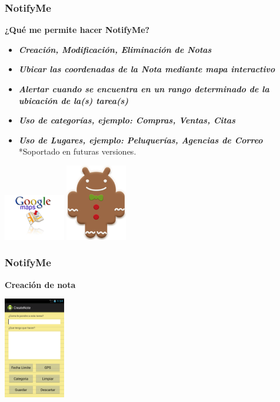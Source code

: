 \documentclass[9pt]{beamer}
\begin{document}
	\begin{frame}
		\frametitle{NotifyMe}
			\begin{block}{\textbf{¿Qué me permite hacer NotifyMe?}}
				\begin{itemize}
					\item \emph{\textbf{Creación, Modificación, Eliminación de Notas}} 
					\item \emph{\textbf{Ubicar las coordenadas de la Nota mediante mapa interactivo}}
					\item \emph{\textbf{Alertar cuando se encuentra en un rango determinado de la ubicación de la(s) tarea(s)}} 				
					\item \emph{\textbf{Uso de categorías, ejemplo: Compras, Ventas, Citas}}
					\item \emph{\textbf{Uso de Lugares, ejemplo: Peluquerías, Agencias de Correo}} *Soportado en futuras versiones.
				\end{itemize}
				\begin{center}
					\includegraphics[width=0.20\textwidth]{gmaps.png}
					\includegraphics[width=0.20\textwidth]{gingerbread.png}
				\end{center}
			\end{block}
	\end{frame}
	
	\begin{frame}
		\frametitle{NotifyMe}
			\begin{block}{\textbf{Creación de nota}}
				\begin{center}
					\includegraphics[width=0.20\textwidth]{crearnota.png}

				\end{center}
			 \end{block}
	\end{frame}
	
\end{document}

